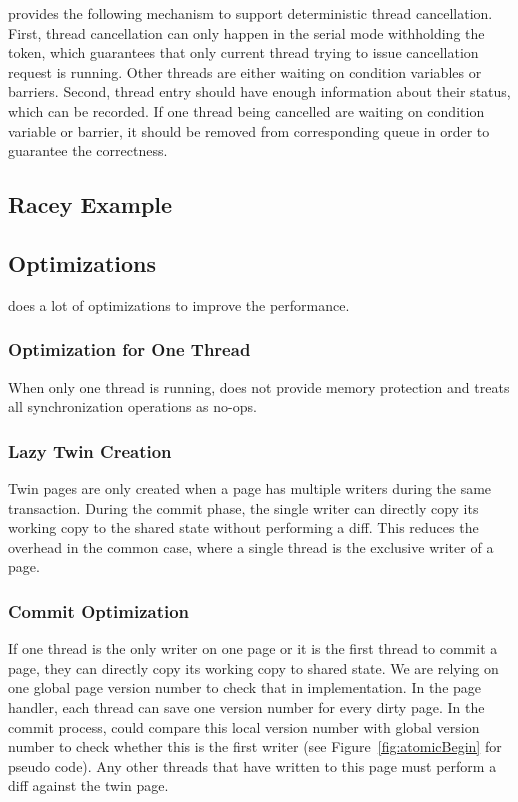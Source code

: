 \dthreads{} provides the following mechanism to support
deterministic thread cancellation. First, thread cancellation can only
happen in the serial mode withholding the token, which guarantees that
only current thread trying to issue cancellation request is
running. Other threads are either waiting on condition variables or
barriers. Second, thread entry should have enough information about
their status, which can be recorded. If one thread being cancelled are
waiting on condition variable or barrier, it should be removed from
corresponding queue in order to guarantee the correctness.

\subsection{Racey Example}

\subsection{Optimizations}
\dthreads{} does a lot of optimizations to improve the performance.

\subsubsection{Optimization for One Thread}
When only one thread is running, \dthreads{} does not provide memory protection 
and treats all synchronization operations as no-ops.

\subsubsection{Lazy Twin Creation}
Twin pages are only created when a page has multiple writers during the same transaction.  
During the commit phase, the single writer can directly copy its working copy to the shared state 
without performing a diff.  This reduces the overhead in the common case, 
where a single thread is the exclusive writer of a page.

\subsubsection{Commit Optimization}
If one thread is the only writer on one page or it is the first thread to commit a page,
they can directly copy its working copy to shared state.
We are relying on one global page version number to check that in implementation. 
In the page handler, each thread can save one version number for every dirty page. 
In the commit process, \dthreads{} could compare this local version number with global version
number to check whether this is the first writer (see Figure~\ref{fig:atomicBegin} for pseudo code).
Any other threads that have written to this page must perform a diff against the twin page.

